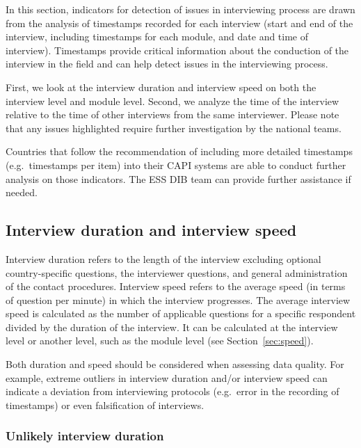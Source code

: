\documentclass[
  11pt,
  a4paperpaper,
]{article}
\newcommand*{\secref}[1]{Section~\ref{#1}}
\begin{document}
In this section, indicators for detection of issues in interviewing
process are drawn from the analysis of timestamps recorded for each
interview (start and end of the interview, including timestamps for each
module, and date and time of interview). Timestamps provide critical
information about the conduction of the interview in the field and can
help detect issues in the interviewing process.

First, we look at the interview duration and interview speed on both the
interview level and module level. Second, we analyze the time of the
interview relative to the time of other interviews from the same
interviewer. Please note that any issues highlighted require further
investigation by the national teams.

Countries that follow the recommendation of including more detailed
timestamps (e.g.~timestamps per item) into their CAPI systems are able
to conduct further analysis on those indicators. The ESS DIB team can
provide further assistance if needed.

\hypertarget{sec:duration_speed}{%
\subsection{Interview duration and interview
speed}\label{sec:duration_speed}}

Interview duration refers to the length of the interview excluding
optional country-specific questions, the interviewer questions, and
general administration of the contact procedures. Interview speed refers
to the average speed (in terms of question per minute) in which the
interview progresses. The average interview speed is calculated as the
number of applicable questions for a specific respondent divided by the
duration of the interview. It can be calculated at the interview level
or another level, such as the module level (see \secref{sec:speed}).

Both duration and speed should be considered when assessing data
quality. For example, extreme outliers in interview duration and/or
interview speed can indicate a deviation from interviewing protocols
(e.g.~error in the recording of timestamps) or even falsification of
interviews.

\hypertarget{sec:duration}{%
\subsubsection{Unlikely interview duration}\label{sec:duration}}
\end{document}
